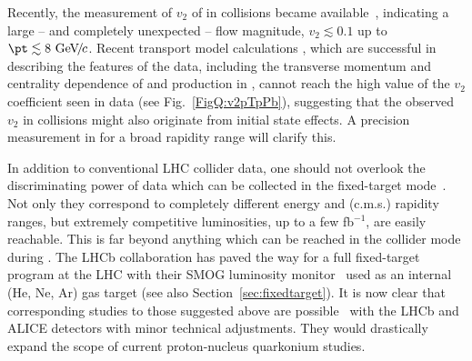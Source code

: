 \documentclass[../report.tex]{subfiles}
\begin{document}
Recently, the measurement of $v_2$ of \PJgy in \pPb collisions became available~\cite{Acharya:2017tfn,Sirunyan:2018kiz}, indicating a large -- and completely unexpected -- flow magnitude, $v_2 \lesssim 0.1$ up to $\pt \lesssim 8\UGeVc$.
Recent transport model calculations \cite{Du:2018wsj}, which are successful in describing the features of the data, including the transverse momentum and centrality dependence of  \PJgy  and  production in \pPb, cannot reach the high value of the $v_2$ coefficient seen in data \cite{Acharya:2017tfn,Sirunyan:2018kiz} (see Fig.~\ref{FigQ:v2pTpPb}),
suggesting that the observed $v_2$ in \pPb collisions might also originate from initial state effects.
A precision measurement in \RunsThreeFour for a broad rapidity range %
will clarify this.


In addition to conventional LHC collider data, one should not overlook the discriminating power of data which can be collected in the fixed-target mode~\cite{Brodsky:2012vg,Lansberg:2012kf}. Not only they correspond to completely different energy and (c.m.s.) rapidity ranges, but extremely competitive luminosities, up to a few fb$^{-1}$, are easily reachable. This is far beyond anything which can be reached in the collider mode during \RunsThreeFour. The LHCb collaboration has paved the way for a full fixed-target program at the LHC with their SMOG luminosity monitor~\cite{FerroLuzzi:2005em} used as an internal (He, Ne, Ar) gas target \cite{Aaij:2018ogq} (see also Section~\ref{sec:fixedtarget}). It is now clear that corresponding studies to those suggested above are possible~\cite{Hadjidakis:2018ifr} with the LHCb and ALICE detectors with minor technical adjustments. They would drastically expand the scope of current proton-nucleus quarkonium studies.
\end{document}
